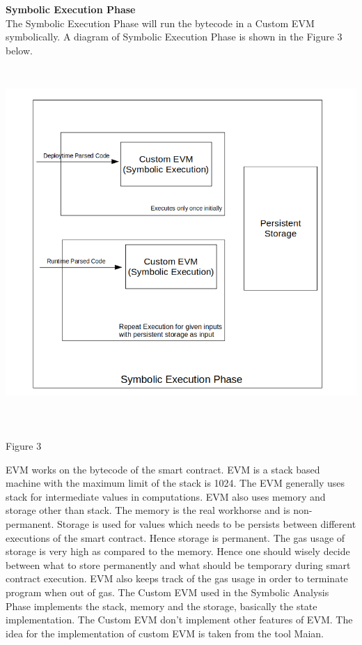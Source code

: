 \documentclass{article}
\begin{document}
\newpage
\noindent\textbf{Symbolic Execution Phase}\\
The Symbolic Execution Phase will run the bytecode in a Custom EVM symbolically. A diagram of Symbolic Execution Phase is shown in the Figure 3 below.\\
\includegraphics[width = 15cm, height = 14cm]{images/3.png}
\begin{center}
    Figure 3\\
\end{center}
EVM works on the bytecode of the smart contract. EVM is a stack based machine with the maximum limit of the stack is 1024. The EVM generally uses stack for intermediate values in computations. EVM also uses memory and storage other than stack. The memory is the real workhorse and is non-permanent. Storage is used for values which needs to be persists between different executions of the smart contract. Hence storage is permanent. The gas usage of storage is very high as compared to the memory. Hence one should wisely decide between what to store permanently and what should be temporary during smart contract execution. EVM also keeps track of the gas usage in order to terminate program when out of gas. The Custom EVM used in the Symbolic Analysis Phase implements the stack, memory and the storage, basically the state implementation. The Custom EVM don't implement other features of EVM. The idea for the implementation of custom EVM is taken from the tool Maian.\\
\end{document}
